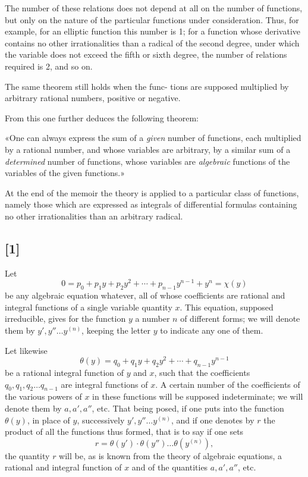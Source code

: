 \documentclass{article}
\begin{document}
The number of these relations does not depend at all on the number of functions, but only on the nature of the particular functions under consideration. Thus, for example, for an elliptic function this number is 1; for a function whose derivative contains no other irrationalities than a radical of the second degree, under which the variable does not exceed the fifth or sixth degree, the number of relations required is 2, and so on.

The same theorem still holds when the func-
tions are supposed multiplied by arbitrary rational numbers, positive or negative.

From this one further deduces the following theorem:

«One can always express the sum of a \emph{given} number of functions, each multiplied by a rational number, and whose variables are arbitrary, by a similar sum of a \emph{determined} number of functions, whose variables are \emph{algebraic} functions of the variables of the given functions.»

At the end of the memoir the theory is applied to a particular class of functions, namely those which are expressed as integrals of differential formulas containing no other irrationalities than an arbitrary radical.

\subsection*{[1]}

Let
\[ 0 = p_0 + p_1 y + p_2 y^{2} + \cdots + p_{n-1} y^{n-1} + y^{n} = \chi(y) \tag{1} \]
be any algebraic equation whatever, all of whose coefficients are rational and integral functions of a single variable quantity $x$. This equation, supposed irreducible, gives for the function $y$ a number $n$ of different forms; we will denote them by $y', y'' \ldots y^{(n)}$, keeping the letter $y$ to indicate any one of them.

Let likewise
\[ \theta(y) = q_0 + q_1 y + q_2 y^{2} + \cdots + q_{n-1} y^{n-1} \tag{2} \]
be a rational integral function of $y$ and $x$, such that the coefficients $q_0, q_1, q_2 \ldots q_{n-1}$ are integral functions of $x$. A certain number of the coefficients of the various powers of $x$ in these functions will be supposed indeterminate; we will denote them by $a, a', a''$, etc.
That being posed, if one puts into the function $\theta(y)$, in place of $y$, successively $y', y'' \ldots y^{(n)}$, and if one denotes by $r$ the product of all the functions thus formed, that is to say if one sets
\[ r = \theta(y') \cdot \theta(y'') \ldots \theta(y^{(n)}), \tag{3} \]
the quantity $r$ will be, as is known from the theory of algebraic equations, a rational and integral function of $x$ and of the quantities $a, a', a''$, etc.
\end{document}
